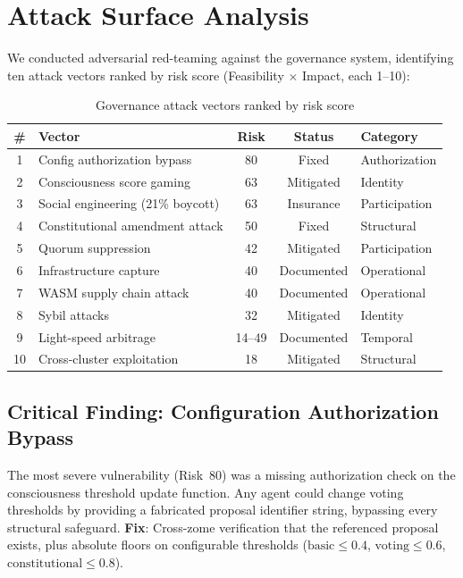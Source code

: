 \documentclass[11pt,a4paper]{article}
\begin{document}
\section{Attack Surface Analysis}
\label{sec:attacks}

We conducted adversarial red-teaming against the governance system, identifying ten attack vectors ranked by risk score (Feasibility $\times$ Impact, each 1--10):

\begin{table}[h]
\centering
\caption{Governance attack vectors ranked by risk score}
\label{tab:attacks}
\begin{tabular}{clccl}
\toprule
\textbf{\#} & \textbf{Vector} & \textbf{Risk} & \textbf{Status} & \textbf{Category} \\
\midrule
1 & Config authorization bypass & 80 & Fixed & Authorization \\
2 & Consciousness score gaming & 63 & Mitigated & Identity \\
3 & Social engineering (21\% boycott) & 63 & Insurance & Participation \\
4 & Constitutional amendment attack & 50 & Fixed & Structural \\
5 & Quorum suppression & 42 & Mitigated & Participation \\
6 & Infrastructure capture & 40 & Documented & Operational \\
7 & WASM supply chain attack & 40 & Documented & Operational \\
8 & Sybil attacks & 32 & Mitigated & Identity \\
9 & Light-speed arbitrage & 14--49 & Documented & Temporal \\
10 & Cross-cluster exploitation & 18 & Mitigated & Structural \\
\bottomrule
\end{tabular}
\end{table}

\subsection{Critical Finding: Configuration Authorization Bypass}

The most severe vulnerability (Risk~80) was a missing authorization check on the consciousness threshold update function. Any agent could change voting thresholds by providing a fabricated proposal identifier string, bypassing every structural safeguard. \textbf{Fix}: Cross-zome verification that the referenced proposal exists, plus absolute floors on configurable thresholds ($\text{basic} \leq 0.4$, $\text{voting} \leq 0.6$, $\text{constitutional} \leq 0.8$).
\end{document}
